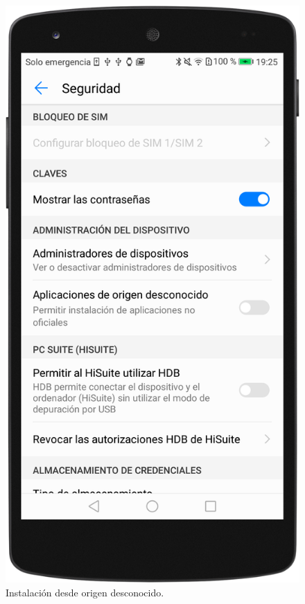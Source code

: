 \begin{figure}[H]
	\centering
	\includegraphics[scale=0.17]{imagenes/seguridad.png}
	\caption{Instalación desde origen desconocido.}
	\label{Instalación desde origen desconocido}
\end{figure}

